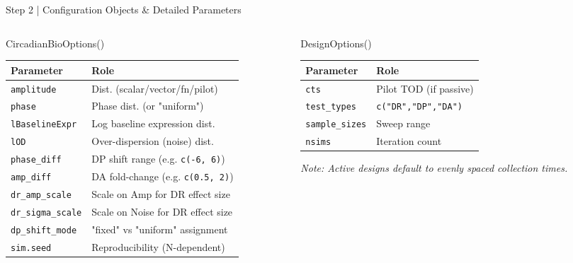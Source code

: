 \documentclass[aspectratio=169,10pt]{beamer}
\begin{document}
\begin{frame}{Step 2 | Configuration Objects \& Detailed Parameters}
\begin{columns}[T,onlytextwidth]
\begin{column}{0.38\textwidth}
  \begin{block}{CircadianBioOptions()}
    \tiny
    \begin{tabular}{lp{3.5cm}}
        \toprule
        \textbf{Parameter} & \textbf{Role} \\
        \midrule
        \texttt{amplitude} & Dist. (scalar/vector/fn/pilot) \\
        \texttt{phase} & Phase dist. (or "uniform") \\
        \texttt{lBaselineExpr} & Log baseline expression dist. \\
        \texttt{lOD} & Over-dispersion (noise) dist. \\
        \texttt{phase\_diff} & DP shift range (e.g. \texttt{c(-6, 6)}) \\
        \texttt{amp\_diff} & DA fold-change (e.g. \texttt{c(0.5, 2)}) \\
        \texttt{dr\_amp\_scale} & Scale on Amp for DR effect size \\
        \texttt{dr\_sigma\_scale} & Scale on Noise for DR effect size \\
        \texttt{dp\_shift\_mode} & "fixed" vs "uniform" assignment \\
        \texttt{sim.seed} & Reproducibility (N-dependent) \\
        \bottomrule
    \end{tabular}
  \end{block}
\end{column}

\begin{column}{0.28\textwidth}
  \begin{block}{DesignOptions()}
    \tiny
    \begin{tabular}{lp{2cm}}
        \toprule
        \textbf{Parameter} & \textbf{Role} \\
        \midrule
        \texttt{cts} & Pilot TOD (if passive) \\
        \texttt{test\_types} & \texttt{c("DR","DP","DA")} \\
        \texttt{sample\_sizes} & Sweep range \\
        \texttt{nsims} & Iteration count \\
        \bottomrule
    \end{tabular}
  \end{block}
  \vspace{0.2cm}
  \textit{\tiny Note: Active designs default to evenly spaced collection times.}
\end{column}


\end{columns}
\end{frame}
\end{document}
